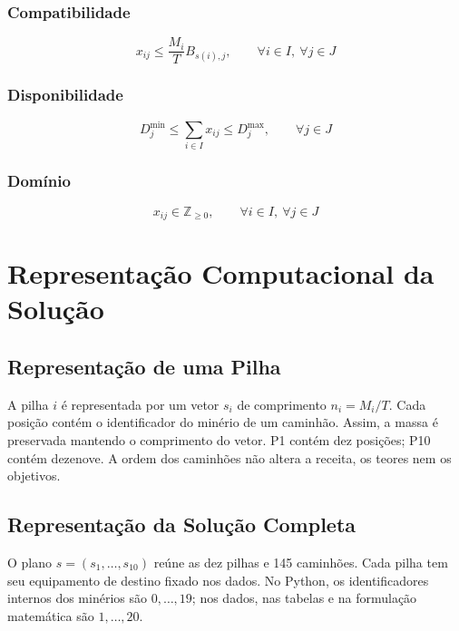 \documentclass[conference]{IEEEtran}
\begin{document}
\subsubsection{Compatibilidade}

\begin{equation}
x_{ij}
\leq
\frac{M_i}{T}
B_{s(i),j},
\qquad
\forall i\in I,\ \forall j\in J
\end{equation}

\subsubsection{Disponibilidade}

\begin{equation}
D_j^{\min}
\leq
\sum_{i\in I} x_{ij}
\leq
D_j^{\max},
\qquad
\forall j\in J
\end{equation}

\subsubsection{Domínio}

\begin{equation}
x_{ij} \in \mathbb{Z}_{\geq 0},
\qquad
\forall i\in I,\ \forall j\in J
\end{equation}

\section{Representação Computacional da Solução}\label{sec:representacao}

\subsection{Representação de uma Pilha}
A pilha $i$ é representada por um vetor $s_i$ de comprimento
$n_i=M_i/T$. Cada posição contém o identificador do minério de um caminhão.
Assim, a massa é preservada mantendo o comprimento do vetor. P1 contém dez
posições; P10 contém dezenove. A ordem dos caminhões não altera a receita,
os teores nem os objetivos.

\subsection{Representação da Solução Completa}
O plano $s=(s_1,\ldots,s_{10})$ reúne as dez pilhas e 145 caminhões.
Cada pilha tem seu equipamento de destino fixado nos dados. No Python,
os identificadores internos dos minérios são $0,\ldots,19$; nos dados,
nas tabelas e na formulação matemática são $1,\ldots,20$.
\end{document}
